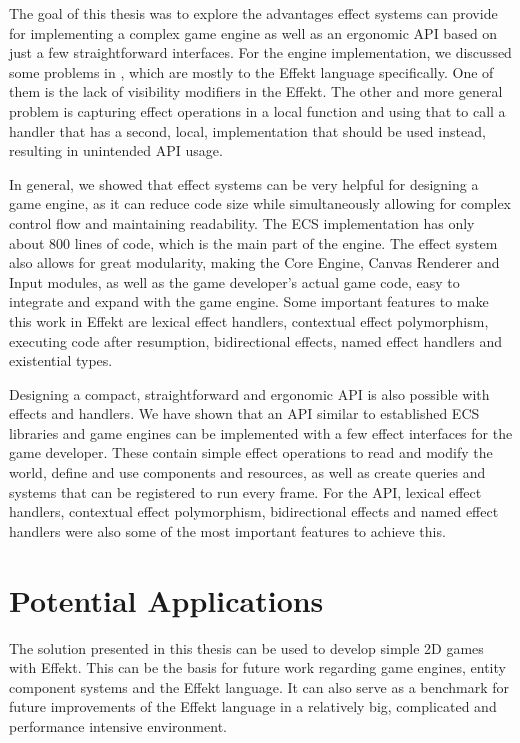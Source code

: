 \label{chap:conclusion}

The goal of this thesis was to explore the advantages effect systems can provide for implementing a complex game engine as well as an ergonomic API based on just a few straightforward interfaces. For the engine implementation, we discussed some problems in , which are mostly to the Effekt language specifically. One of them is the lack of visibility modifiers in the Effekt. The other and more general problem is capturing effect operations in a local function and using that to call a handler that has a second, local, implementation that should be used instead, resulting in unintended API usage.

In general, we showed that effect systems can be very helpful for designing a game engine, as it can reduce code size while simultaneously allowing for complex control flow and maintaining readability. The ECS implementation has only about 800 lines of code, which is the main part of the engine. The effect system also allows for great modularity, making the Core Engine, Canvas Renderer and Input modules, as well as the game developer's actual game code, easy to integrate and expand with the game engine. Some important features to make this work in Effekt are lexical effect handlers, contextual effect polymorphism, executing code after resumption, bidirectional effects, named effect handlers and existential types.

Designing a compact, straightforward and ergonomic API is also possible with effects and handlers. We have shown that an API similar to established ECS libraries and game engines can be implemented with a few effect interfaces for the game developer. These contain simple effect operations to read and modify the world, define and use components and resources, as well as create queries and systems that can be registered to run every frame. For the API, lexical effect handlers, contextual effect polymorphism, bidirectional effects and named effect handlers were also some of the most important features to achieve this.

\section*{Potential Applications}

The solution presented in this thesis can be used to develop simple 2D games with Effekt. This can be the basis for future work regarding game engines, entity component systems and the Effekt language. It can also serve as a benchmark for future improvements of the Effekt language in a relatively big, complicated and performance intensive environment.

